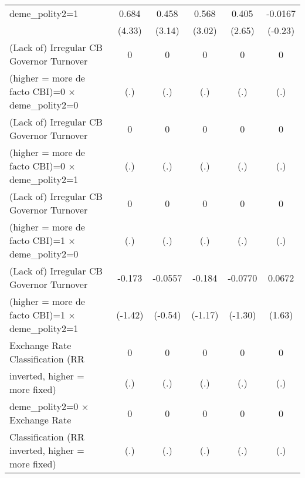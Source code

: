 \begin{table}[htbp]
\begin{tabular}{l*{5}{c}}
\addlinespace
deme\_polity2=1                          &    0.684\sym{***}&    0.458\sym{**} &    0.568\sym{**} &    0.405\sym{**} &  -0.0167         \\
                                        &   (4.33)         &   (3.14)         &   (3.02)         &   (2.65)         &  (-0.23)         \\
\addlinespace
(Lack of) Irregular CB Governor Turnover&        0         &        0         &        0         &        0         &        0         \\
(higher = more de facto CBI)=0 $\times$ deme\_polity2=0&      (.)         &      (.)         &      (.)         &      (.)         &      (.)         \\
\addlinespace
(Lack of) Irregular CB Governor Turnover&        0         &        0         &        0         &        0         &        0         \\
(higher = more de facto CBI)=0 $\times$ deme\_polity2=1&      (.)         &      (.)         &      (.)         &      (.)         &      (.)         \\
\addlinespace
(Lack of) Irregular CB Governor Turnover&        0         &        0         &        0         &        0         &        0         \\
(higher = more de facto CBI)=1 $\times$ deme\_polity2=0&      (.)         &      (.)         &      (.)         &      (.)         &      (.)         \\
\addlinespace
(Lack of) Irregular CB Governor Turnover&   -0.173         &  -0.0557         &   -0.184         &  -0.0770         &   0.0672         \\
(higher = more de facto CBI)=1 $\times$ deme\_polity2=1&  (-1.42)         &  (-0.54)         &  (-1.17)         &  (-1.30)         &   (1.63)         \\
\addlinespace
Exchange Rate Classification (RR        &        0         &        0         &        0         &        0         &        0         \\
inverted, higher = more fixed)          &      (.)         &      (.)         &      (.)         &      (.)         &      (.)         \\
\addlinespace
deme\_polity2=0 $\times$ Exchange Rate   &        0         &        0         &        0         &        0         &        0         \\
Classification (RR inverted, higher = more fixed)&      (.)         &      (.)         &      (.)         &      (.)         &      (.)         \\

\end{tabular}
\end{table}
